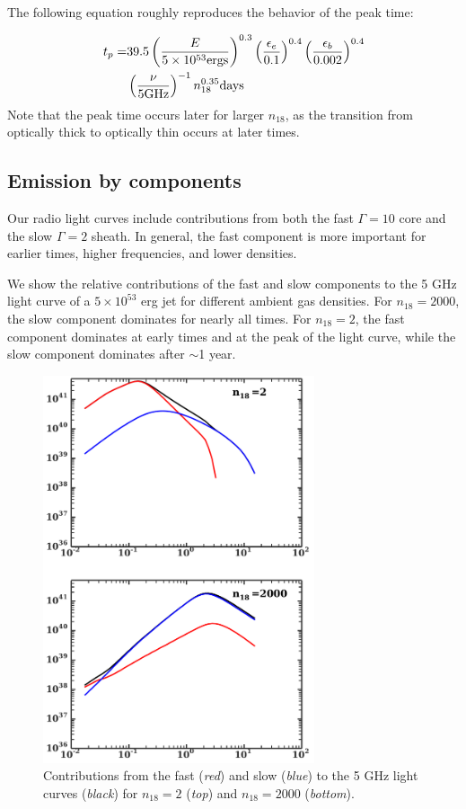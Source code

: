 \documentclass[usenatbib,fleqn]{mnras}
\begin{document}
The following equation roughly reproduces the behavior of the peak
time:

\begin{align}
  t_p =& 39.5 \left(\frac{E}{5 \times 10^{53} {\rm ergs}}\right)^{0.3}   \left(\frac{\epsilon_e}{0.1}\right)^{0.4}
  \left(\frac{\epsilon_b}{0.002}\right)^{0.4}\nonumber\\
 & \left(\frac{\nu}{5 {\rm GHz}}\right)^{-1} n_{18}^{0.35}  {\rm days}
\label{eq:peakTime}
\end{align}
%
Note that the peak time occurs later for larger $n_{18}$, as the
transition from optically thick to optically thin occurs at later times.

\subsection{Emission by components}
Our radio light curves include contributions from both the fast
$\Gamma=10$ core and the slow $\Gamma=2$ sheath. In general, the fast
component is more important for earlier times, higher frequencies, and
lower densities. 

We show the relative contributions of the fast and slow components to
the 5 GHz light curve of a $5 \times 10^{53}$ erg jet for different
ambient gas densities. For $n_{18}=2000$, the slow component dominates
for nearly all times.  For $n_{18}=2$, the fast component dominates at
early times and at the peak of the light curve, while the slow
component dominates after $\sim$1 year.

\begin{figure}
\includegraphics[width=8cm]{components.pdf}
\caption{\label{fig:components} Contributions from the fast
  (\textit{red}) and slow (\textit{blue}) to the 5 GHz light curves
  (\textit{black}) for $n_{18}=2$ (\textit{top}) and $n_{18}=2000$
  (\textit{bottom}).}
\end{figure}
\end{document}
